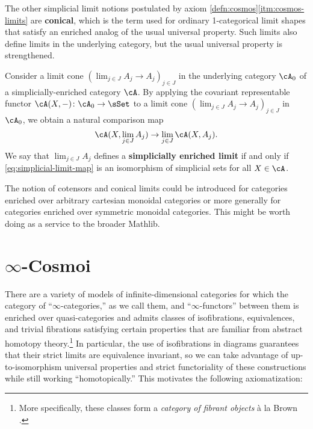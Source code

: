 The other simplicial limit notions postulated by axiom \ref{defn:cosmos}\ref{itm:cosmos-limits} are \textbf{conical}, which is the term used for ordinary 1-categorical limit shapes that satisfy an enriched analog of the usual universal property.   Such limits also define limits in the underlying category, but the usual universal property is strengthened.

\begin{definition}\label{defn:simplicial-conical-limit}
  \leanok
{}
  Consider a limit cone $(\lim_{j \in J}A_j \to A_j)_{j \in J}$ in the underlying category $\cA_0$ of a simplicially-enriched category $\cA$.  By applying the covariant rep\-re\-sentable functor $\cA(X,-) \colon \cA_0 \to \sSet$ to a limit cone $(\lim_{j \in J}A_j \to A_j)_{j \in J}$ in $\cA_0$, we obtain a natural comparison map
  \begin{equation}\label{eq:simplicial-limit-map} \cA(X,\lim_{j \in J}A_j) \to \lim_{j \in J}\cA(X,A_j).
  \end{equation}
  We say that $\lim_{j\in J}A_j$ defines a \textbf{simplicially enriched limit} if and only if \eqref{eq:simplicial-limit-map} is an isomorphism of simplicial sets for all $X \in \cA$.
\end{definition}

\begin{rmk}
  The notion of cotensors and conical limits could be introduced for categories enriched over arbitrary cartesian monoidal categories or more generally for categories enriched over symmetric monoidal categories. This might be worth doing as a service to the broader Mathlib.
\end{rmk}

\section{\texorpdfstring{$\infty$}{Infinity}-Cosmoi}\label{sec:cosmos}

There are a variety of models of infinite-dimensional categories for which the category of ``$\infty$-categories,'' as we call them, and ``$\infty$-functors'' between them is enriched over quasi-categories and admits classes of isofibrations, equivalences, and trivial fibrations satisfying certain
properties that are familiar from abstract homotopy theory.\footnote{More specifically, these classes form a \emph{category of fibrant objects} \`{a} la Brown \cite{Brown:1973ah}.} In particular, the use of isofibrations in diagrams guarantees that their strict limits are equivalence invariant, so we can take advantage of up-to-isomorphism universal properties and strict functoriality of these constructions while still working ``homotopically.'' This motivates the following axiomatization:



